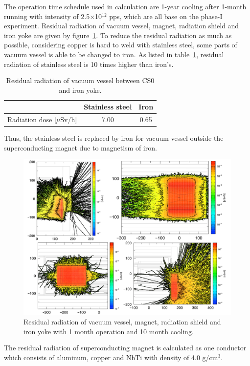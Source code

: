 The operation time schedule used in calculation are 1-year cooling after 1-month running with intensity of 2.5$\times$10$^{12}$ pps, which are all base on the phase-I experiment.
Residual radiation of vacuum vessel, magnet, radiation shield and iron yoke are given by figure~\ref{2part}.
To reduce the residual radiation as much as possible, considering copper is hard to weld with stainless steel, some parts of vacuum vessel is able to be changed to iron.
As listed in table~\ref{vecuum}, residual radiation of stainless steel is 10 times higher than iron's.
\begin{table}[H]
 \centering
 \begin{tabular}{ccc} \hline \hline
  & Stainless steel & Iron  \\ \hline
  Radiation dose [$\mu$Sv/h] & 7.00 & 0.65 \\ \hline \hline
 \end{tabular}
 \caption{Residual radiation of vacuum vessel between CS0 and iron yoke.}
 \label{vecuum}
\end{table}
Thus, the stainless steel is replaced by iron for vacuum vessel outside the superconducting magnet due to magnetism of iron.
 \begin{figure}[H]
  \centering
  \includegraphics[scale=0.43]{chapter3/fig/partres.pdf}
  \caption{Residual radiation of vacuum vessel, magnet, radiation shield and iron yoke with 1 month operation and 10 month cooling.}
  \label{2part}
 \end{figure}
The residual radiation of superconducting magnet is calculated as one conductor which consists of aluminum, copper and NbTi with density of 4.0 g/cm$^3$.
